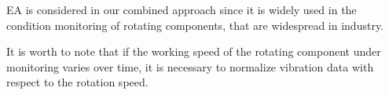 EA is considered in our combined approach since it is widely used in the condition monitoring of rotating components, that are widespread in industry. 


\begin{remark}  
It is worth to note that if the working speed of the rotating component under monitoring varies over time, it is necessary to normalize vibration data  with respect to the rotation speed. 
\end{remark}
